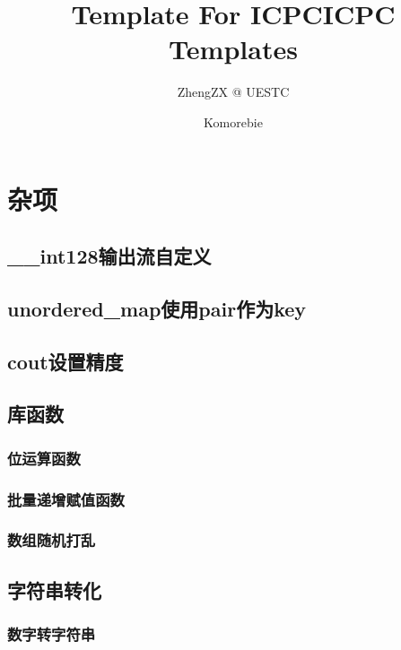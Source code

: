 \documentclass[10pt,a4paper]{article}
\title{Template For ICPC}
\author{ZhengZX @ UESTC}
\begin{document}
\title{ICPC Templates}
\author {Komorebie}
\maketitle
\tableofcontents
\newpage
\section{杂项}
\subsection{\_\_int128输出流自定义}

\subsection{unordered\_map使用pair作为key}
\begin{spacing}{1.5}

\end{spacing}

\subsection{cout设置精度}

\subsection{库函数}
\subsubsection{位运算函数}

\subsubsection{批量递增赋值函数}

\subsubsection{数组随机打乱}

\subsection{字符串转化}
\subsubsection{数字转字符串}
\begin{spacing}{1.5}

\end{spacing}

\end{document}
